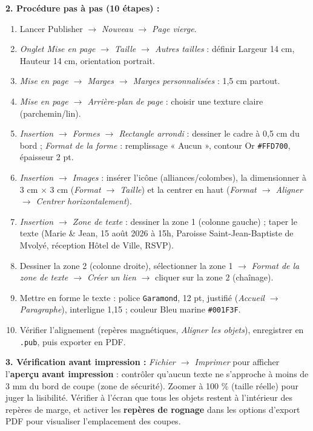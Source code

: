 \documentclass[11pt]{article}
\begin{document}
\begin{corrige}
\textbf{2. Procédure pas à pas (10 étapes) :}
\begin{enumerate}
    \item Lancer Publisher $\rightarrow$ \textit{Nouveau} $\rightarrow$ \textit{Page vierge}.
    \item \textit{Onglet Mise en page $\rightarrow$ Taille $\rightarrow$ Autres tailles} : définir Largeur 14 cm, Hauteur 14 cm, orientation portrait.
    \item \textit{Mise en page $\rightarrow$ Marges $\rightarrow$ Marges personnalisées} : 1,5 cm partout.
    \item \textit{Mise en page $\rightarrow$ Arrière-plan de page} : choisir une texture claire (parchemin/lin).
    \item \textit{Insertion $\rightarrow$ Formes $\rightarrow$ Rectangle arrondi} : dessiner le cadre à 0,5 cm du bord ; \textit{Format de la forme} : remplissage « Aucun », contour Or \texttt{\#FFD700}, épaisseur 2 pt.
    \item \textit{Insertion $\rightarrow$ Images} : insérer l'icône (alliances/colombes), la dimensionner à 3 cm $\times$ 3 cm (\textit{Format $\rightarrow$ Taille}) et la centrer en haut (\textit{Format $\rightarrow$ Aligner $\rightarrow$ Centrer horizontalement}).
    \item \textit{Insertion $\rightarrow$ Zone de texte} : dessiner la zone 1 (colonne gauche) ; taper le texte (Marie \& Jean, 15 août 2026 à 15h, Paroisse Saint-Jean-Baptiste de Mvolyé, réception Hôtel de Ville, RSVP).
    \item Dessiner la zone 2 (colonne droite), sélectionner la zone 1 $\rightarrow$ \textit{Format de la zone de texte $\rightarrow$ Créer un lien} $\rightarrow$ cliquer sur la zone 2 (chaînage).
    \item Mettre en forme le texte : police \texttt{Garamond}, 12 pt, justifié (\textit{Accueil $\rightarrow$ Paragraphe}), interligne 1,15 ; couleur Bleu marine \texttt{\#001F3F}.
    \item Vérifier l'alignement (repères magnétiques, \textit{Aligner les objets}), enregistrer en \texttt{.pub}, puis exporter en PDF.
\end{enumerate}

\textbf{3. Vérification avant impression :} \textit{Fichier $\rightarrow$ Imprimer} pour afficher l'\textbf{aperçu avant impression} : contrôler qu'aucun texte ne s'approche à moins de 3 mm du bord de coupe (zone de sécurité). Zoomer à 100 \% (taille réelle) pour juger la lisibilité. Vérifier à l'écran que tous les objets restent à l'intérieur des repères de marge, et activer les \textbf{repères de rognage} dans les options d'export PDF pour visualiser l'emplacement des coupes.


\end{corrige}
\end{document}

